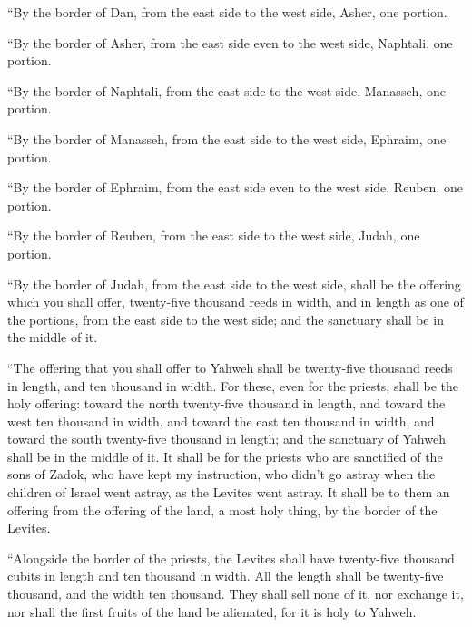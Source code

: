  ``By the border of Dan, from the east side to the west
side, Asher, one portion.

 ``By the border of Asher, from the east side even to the
west side, Naphtali, one portion.

 ``By the border of Naphtali, from the east side to the west
side, Manasseh, one portion.

 ``By the border of Manasseh, from the east side to the west
side, Ephraim, one portion.

 ``By the border of Ephraim, from the east side even to the
west side, Reuben, one portion.

 ``By the border of Reuben, from the east side to the west
side, Judah, one portion.

 ``By the border of Judah, from the east side to the west
side, shall be the offering which you shall offer, twenty-five thousand
reeds in width, and in length as one of the portions, from the east side
to the west side; and the sanctuary shall be in the middle of it.

 ``The offering that you shall offer to Yahweh shall be
twenty-five thousand reeds in length, and ten thousand in width.
 For these, even for the priests, shall be the holy
offering: toward the north twenty-five thousand in length, and toward
the west ten thousand in width, and toward the east ten thousand in
width, and toward the south twenty-five thousand in length; and the
sanctuary of Yahweh shall be in the middle of it.  It shall
be for the priests who are sanctified of the sons of Zadok, who have
kept my instruction, who didn't go astray when the children of Israel
went astray, as the Levites went astray.  It shall be to
them an offering from the offering of the land, a most holy thing, by
the border of the Levites.

 ``Alongside the border of the priests, the Levites shall
have twenty-five thousand cubits in length and ten thousand in width.
All the length shall be twenty-five thousand, and the width ten
thousand.  They shall sell none of it, nor exchange it, nor
shall the first fruits of the land be alienated, for it is holy to
Yahweh.

